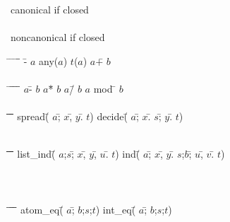 \begin{figure}
\begin{minipage}{\hsize}
\begin{tabbing}
{\scriptsize{canonical if closed}}\\[-4pt]
\makebox[\hsize]{\dotfill{}}\\[-1pt]
\scriptsize{noncanonical if closed}
\end{tabbing}
\begin{tabbing}
\= \hspace{1in}	\= \hspace{1in}	\= \hspace{1in}	\= \=			\kill
-\= $a$		\> any($a$)	\> $t$($a$)	\> $a$+\= $b$	       \\[-1ex]
 \> \parg	\>		\> \parg	\> \parg
						       \> \parg		\\[1ex]
\= \hspace{1in}	\= \= \hspace{1in}
				\= \= \hspace{1in}
						\= \=			\kill
$a$-\= $b$	\> $a$*\= $b$	\> $a$/\= $b$	\> $a$ mod \= $b$      \\[-1ex]
\parg
    \> \parg	 \> \parg
		        \> \parg
				\> \parg
				       \> \parg \> \parg   \> \parg    \\[1ex]
\= \= \= \= \hspace{2in}	\= \= \= \= \= \= 			\kill
spread(\= $a$;\= $x$,\= $y$.\= $t$)
				\> decide(\= $a$;\= $x$.\= $s$;\= $y$.\= $t$) \\[-.6ex]
       \> \parg
	      \> \bvx
		     \> \bvy
			    \> \bvx
				\> 	  \> \parg
						 \> \bvx
							\> \bvx \> \bvy
								      \> \bvy \\[-1.5ex]
	\>    \>     \>	    \> \bvy			
\end{tabbing}
\begin{tabbing}
\= \= \= \= \= \hspace{2in}	\= \= \= \= \= \= \= \= 		\kill
list\_ind(\= $a$;$s$;\= $x$,\= $y$,\= $u$.\= $t$)
\> ind(\= $a$;\= $x$,\= $y$.\= $s$;$b$;\= $u$,\= $v$.\= $t$) \\[-.6ex]
	  \> \parg   \> \bvx
			    \> \bvy
				   \> \bvu
					  \> \bvx
\>     \> \parg
	      \> \bvx
		     \> \bvy
			    \> \bvx    \> \bvu
					      \> \bvv
						     \> \bvu \\[-1.5ex]
	  \>	     \>	   \>	   \>	  \> \bvy
\>	\>    \>     \>	    \> \bvy    \>      \>    \> \bvv \\[-1.2ex]
	  \>	     \>	   \>	   \>	  \> \bvu	     \\[1ex]
\= \= \hspace{2in}		\= \= \= \hspace{2in}		\= \= \= \kill
atom\_eq(\= $a$;\= $b$;$s$;$t$) \> int\_eq(\= $a$;\= $b$;$s$;$t$)
																\\[-1ex]
	 \> \parg
		\> \parg	\>	   \> \parg
						  \> \parg	\>	\\[1ex]
									       

\end{tabbing}
\end{minipage}
\end{figure}
